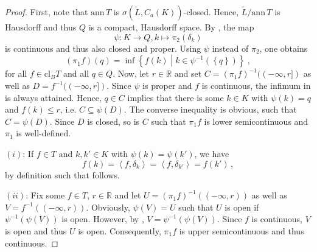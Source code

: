 \documentclass[
	paper=A4,
	pagesize=auto,
	fontsize=12pt
]{scrartcl}
\theoremstyle{plain}
\theoremstyle{remark}
\theoremstyle{definition}
\begin{document}
\begin{proof}
First, note that $\mathrm{ann}\, T$ is $\sigma(\widetilde{L}, C_a(K))$-closed.
Hence, $\widetilde{L} / \mathrm{ann}\, T$ is Hausdorff and thus $Q$ is a compact, Hausdorff space.
By , the map
%
\begin{equation}
\psi : K \to Q, k \mapsto \pi_2 \left( \delta_k \right)
\end{equation}
%
is continuous and thus also closed and proper.
Using $\psi$ instead of $\pi_2$, one obtains
%
\begin{equation}
\label{eq:pi1fDefinitionViaPsi}
\left( \pi_1 f \right) \left( q \right)
=
\inf \left\{ f \left( k \right) \middle| k \in \psi^{-1} \left( \left\{ q \right\} \right) \right\} \ ,
\end{equation}
%
for all $f \in \mathrm{cl}_B T$ and all $q \in Q$.
Now, let $r \in \mathbb{R}$ and set $C = (\pi_1 f)^{-1}( (- \infty, r] )$ as well as $D = f^{-1}( (-\infty, r] )$.
Since $\psi$ is proper and $f$ is continuous, the infimum in  is always attained.
Hence, $q \in C$ implies that there is some $k \in K$ with $\psi(k) = q$ and $f(k) \le r$, i.e. $C \subseteq \psi(D)$.
The converse inequality is obvious, such that $C = \psi(D)$.
Since $D$ is closed, so is $C$ such that $\pi_1 f$ is lower semicontinuous and $\pi_1$ is well-defined.

$(i)$:
If $f \in T$ and $k, k' \in K$ with $\psi(k) = \psi(k')$, we have
%
\begin{equation}
\label{eq:CoreEqualityOnEquivalentElements}
f \left( k \right)
=
\left< f, \delta_k \right>
=
\left< f, \delta_{k'} \right>
=
f \left( k' \right) \, ,
\end{equation}
%
by definition such that  follows.

$(ii)$:
Fix some $f \in T$, $r \in \mathbb{R}$ and let $U = (\pi_1 f)^{-1}( (-\infty, r) )$ as well as $V = f^{-1}( (-\infty, r ) )$.
Obviously, $\psi(V) = U$ such that $U$ is open if $\psi^{-1}( \psi(V) )$ is open.
However, by , $V = \psi^{-1}( \psi(V) )$.
Since $f$ is continuous, $V$ is open and thus $U$ is open.
Consequently, $\pi_1 f$ is upper semicontinuous and thus continuous.


\end{proof}
\end{document}
